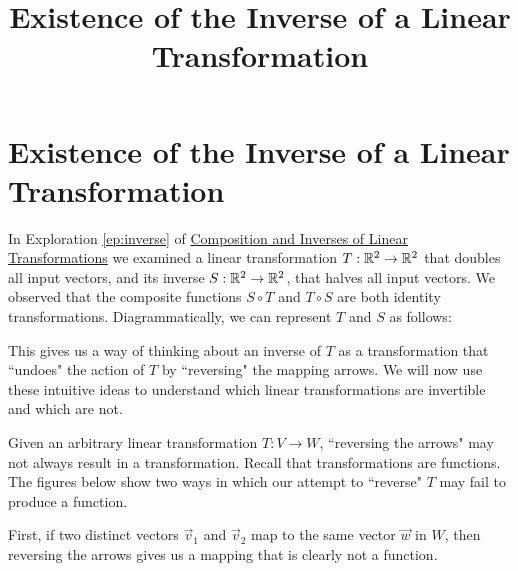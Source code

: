 \documentclass{ximera}
\title{Existence of the Inverse of a Linear Transformation} \license{CC BY-NC-SA 4.0}
\begin{document}
\begin{abstract}
 \end{abstract}
\maketitle

\section{Existence of the Inverse of a Linear Transformation}

In Exploration \ref{ep:inverse} of \href{https://ximera.osu.edu/oerlinalg/LinearAlgebra/LTR-0030/main}{Composition and Inverses of Linear Transformations} we examined a linear transformation $T:\mathbb{R}^2\rightarrow \mathbb{R}^2$ that doubles all input vectors, and its inverse $S:\mathbb{R}^2\rightarrow \mathbb{R}^2$, that halves all input vectors.  We observed that the composite functions $S\circ T$ and $T\circ S$ are both identity transformations.  Diagrammatically, we can represent $T$ and $S$ as follows:
 
\begin{center}
 \end{center} 

This gives us a way of thinking about an inverse of $T$ as a transformation that ``undoes" the action of $T$ by ``reversing" the mapping arrows.  We will now use these intuitive ideas to understand which linear transformations are invertible and which are not.

Given an arbitrary linear transformation $T:V\rightarrow W$, ``reversing the arrows"
 may not always result in a transformation. Recall that transformations are functions.  The figures below show two ways in which our attempt to ``reverse" $T$ may fail to produce a function.
 
 First, if two distinct vectors $\vec{v}_1$ and $\vec{v}_2$ map to the same vector $\vec{w}$ in $W$, then reversing the arrows gives us a mapping that is clearly not a function. 
 
\end{document}
